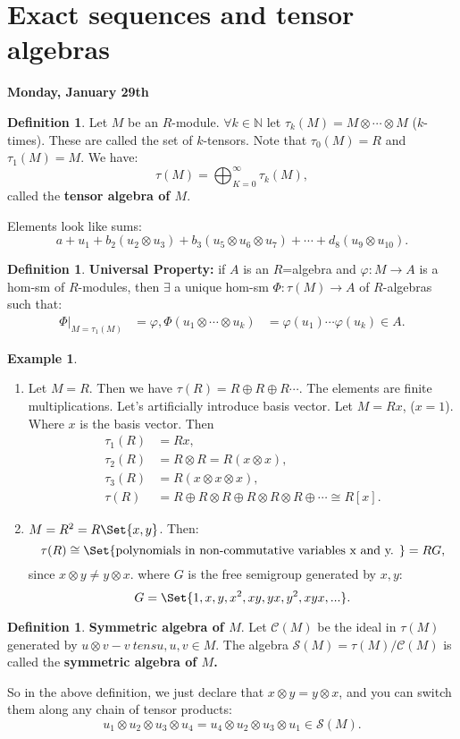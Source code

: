 \documentclass[9pt,reqno,twoside]{amsbook}
\theoremstyle{plain}
\numberwithin{section}{chapter}
\numberwithin{equation}{chapter}
\theoremstyle{definition}
\newtheorem{Def}[theorem]{Definition}
\newtheorem{Ex}[theorem]{Example}
\theoremstyle{remark}
\theoremstyle{plain}
\newcommand{\n}{\mathbb{N}}
\newcommand{\bee}{\begin{equation}\begin{aligned}}
\newcommand{\eee}{\end{aligned}\end{equation}}
\newcommand{\tens}{\otimes}
\renewcommand{\phi}{\varphi}
\begin{document}
\section{Exact sequences and tensor algebras}

\textbf{Monday, January 29th}

\begin{Def}
Let $M$ be an $R$-module. $\forall k \in \n$ let $\tau_k(M) = M \tens \cdots \tens M$ ($k$-times). These are called the set of $k$-tensors. Note that $\tau_0(M) = R$ and $\tau_1(M) = M$. We have:
$$
\tau(M) = \bigoplus_{K = 0}^\infty \tau_k(M),
$$
called the \textbf{tensor algebra of $M$}. 
\end{Def}

Elements look like sums:
$$
a + u_1 + b_2(u_2 \tens u_3) + b_3(u_5 \tens u_6 \tens u_7) + \cdots + d_8(u_9 \tens u_{10}).
$$

\begin{Def}
\textbf{Universal Property: }if $A$ is an $R$=algebra and $\phi: M \to A$ is a hom-sm of $R$-modules, then $\exists$ a unique hom-sm $\Phi:\tau(M) \to A$ of $R$-algebras such that:
\bee
\Phi|_{M = \tau_1(M)} &= \phi,
\Phi(u_1 \tens \cdots \tens u_k) &= \phi(u_1) \cdots \phi(u_k) \in A.
\eee
\end{Def}

\begin{Ex}
\begin{enumerate}
\item Let $M = R$. Then we have $\tau(R) = R \oplus R \oplus R \cdots$. The elements are finite multiplications. Let's artificially introduce basis vector. Let $M = Rx$, ($x = 1$). Where $x$ is the basis vector. Then 
\bee 
\tau_1(R) &= Rx,\\
\tau_2(R) &= R \tens R = R(x \tens x),\\
\tau_3(R) &= R(x \tens x \tens x),\\
\tau(R) &= R \oplus R \tens R \oplus R \tens R \tens R \oplus \cdots \cong R[x].
\eee

\item $M = R^2 = R\Set{x,y}$. Then:
$$
\tau(R) \cong \Set{\text{polynomials in non-commutative variables x and y. }} = RG,
$$
since $x \tens y \neq y \tens x$. where $G$ is the free semigroup generated by $x,y$:
$$
G = \Set{1,x,y,x^2,xy,yx,y^2,xyx,...}.
$$
\end{enumerate}
\end{Ex}

\begin{Def}
\textbf{Symmetric algebra of $M$}. Let $\mathcal{C}(M)$ be the ideal in $\tau(M)$ generated by $u \tens v - v\ tens u, u,v \in M$. The algebra $\mathcal{S}(M) = \tau(M)/\mathcal{C}(M)$ is called the \textbf{symmetric algebra of $M$.}
\end{Def}
So in the above definition, we just declare that $x \tens y = y \tens x$, and you can switch them along any chain of tensor products:
$$
u_1 \tens u_2 \tens u_3 \tens u_4 = u_4 \tens u_2 \tens u_3 \tens u_1 \in \mathcal{S}(M).
$$
\end{document}
